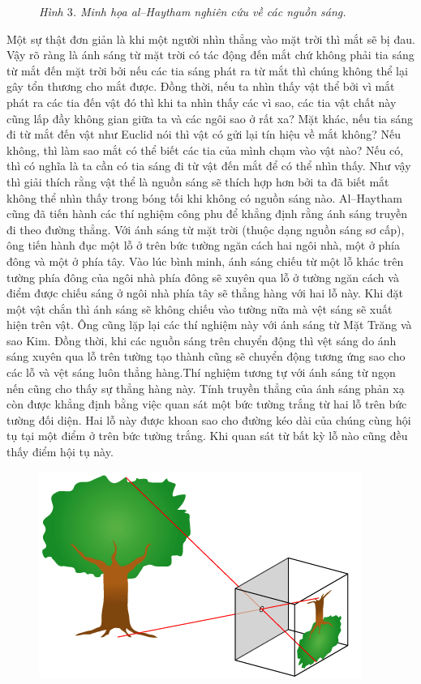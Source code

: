 \begin{multicols}{2}
\begin{figure}[H]
		\caption{\small\textit{\color{lichsutoanhoc}Hình $3$. Minh họa al--Haytham nghiên cứu về các nguồn sáng.}}
		\vspace*{-10pt}
	\end{figure}
	Một sự thật đơn giản là khi một người nhìn thẳng vào mặt trời thì mắt sẽ bị đau. Vậy rõ ràng là ánh sáng từ mặt trời có tác động đến mắt chứ không phải tia sáng từ mắt đến mặt trời bởi nếu các tia sáng phát ra từ mắt thì chúng không thể lại gây tổn thương cho mắt được. Đồng thời, nếu ta nhìn thấy vật thể bởi vì mắt phát ra các tia đến vật đó thì khi ta nhìn thấy các vì sao, các tia vật chất này cũng lấp đầy không gian giữa ta và các ngôi sao ở rất xa?
	\vskip 0.1cm
	Mặt khác, nếu tia sáng đi từ mắt đến vật như Euclid nói thì vật có gửi lại tín hiệu về mắt không? Nếu không, thì làm sao mắt có thể biết các tia của mình chạm vào vật nào? Nếu có, thì có nghĩa là ta cần có tia sáng đi từ vật đến mắt để có thể nhìn thấy. Như vậy thì giải thích rằng vật thể là nguồn sáng sẽ thích hợp hơn bởi ta đã biết mắt không thể nhìn thấy trong bóng tối khi không có nguồn sáng nào.
	\vskip 0.1cm
	Al--Haytham cũng đã tiến hành các thí nghiệm công phu để khẳng định rằng ánh sáng truyền đi theo đường thẳng. Với ánh sáng từ mặt trời (thuộc dạng nguồn sáng sơ cấp), ông tiến hành đục một lỗ ở trên bức tường ngăn cách hai ngôi nhà, một ở phía đông và một ở phía tây. Vào lúc bình minh, ánh sáng chiếu từ một lỗ khác trên tường phía đông của ngôi nhà phía đông sẽ xuyên qua lỗ ở tường ngăn cách và điểm được chiếu sáng ở ngôi nhà phía tây sẽ thẳng hàng với hai lỗ này. Khi đặt một vật chắn thì ánh sáng sẽ không chiếu vào tường nữa mà vệt sáng sẽ xuất hiện trên vật. Ông cũng lặp lại các thí nghiệm này với ánh sáng từ Mặt Trăng và sao Kim. Đồng thời, khi các nguồn sáng trên chuyển động thì vệt sáng do ánh sáng xuyên qua lỗ trên tường tạo thành cũng sẽ chuyển động tương ứng sao cho các lỗ và vệt sáng luôn thẳng hàng.Thí nghiệm tương tự với ánh sáng từ ngọn nến cũng cho thấy sự thẳng hàng này. Tính truyền thẳng của ánh sáng phản xạ còn được khẳng định bằng việc quan sát một bức tường trắng từ hai lỗ trên bức tường đối diện. Hai lỗ này được khoan sao cho đường kéo dài của chúng cùng hội tụ tại một điểm ở trên bức tường trắng. Khi quan sát từ bất kỳ lỗ nào cũng đều thấy điểm hội tụ này.
	\begin{figure}[H]
		\vspace*{-10pt}
		\centering
		\captionsetup{labelformat= empty, justification=centering}
		\includegraphics[width= 0.9\linewidth]{5}

\end{figure}
\end{multicols}
